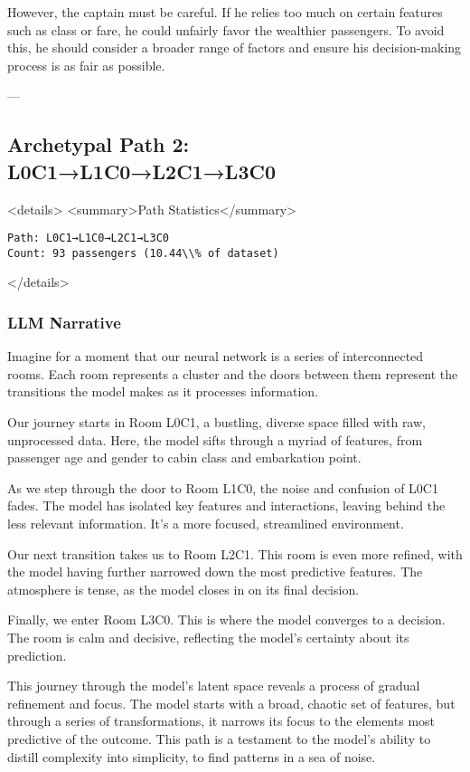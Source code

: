 However, the captain must be careful. If he relies too much on certain features such as class or fare, he could unfairly favor the wealthier passengers. To avoid this, he should consider a broader range of factors and ensure his decision-making process is as fair as possible.

---

\subsection*{Archetypal Path 2: L0C1→L1C0→L2C1→L3C0}

<details>
<summary>Path Statistics</summary>

\begin{verbatim}
Path: L0C1→L1C0→L2C1→L3C0
Count: 93 passengers (10.44\\% of dataset)
\end{verbatim}
</details>

\subsubsection*{LLM Narrative}

Imagine for a moment that our neural network is a series of interconnected rooms. Each room represents a cluster and the doors between them represent the transitions the model makes as it processes information.

Our journey starts in Room L0C1, a bustling, diverse space filled with raw, unprocessed data. Here, the model sifts through a myriad of features, from passenger age and gender to cabin class and embarkation point.

As we step through the door to Room L1C0, the noise and confusion of L0C1 fades. The model has isolated key features and interactions, leaving behind the less relevant information. It's a more focused, streamlined environment.

Our next transition takes us to Room L2C1. This room is even more refined, with the model having further narrowed down the most predictive features. The atmosphere is tense, as the model closes in on its final decision.

Finally, we enter Room L3C0. This is where the model converges to a decision. The room is calm and decisive, reflecting the model's certainty about its prediction.

This journey through the model's latent space reveals a process of gradual refinement and focus. The model starts with a broad, chaotic set of features, but through a series of transformations, it narrows its focus to the elements most predictive of the outcome. This path is a testament to the model's ability to distill complexity into simplicity, to find patterns in a sea of noise.


